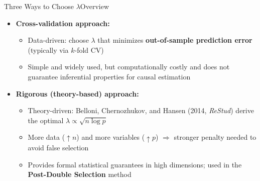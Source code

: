 \documentclass[hyperref={pdfpagelabels=false}]{beamer}
\begin{document}
\begin{frame}{Three Ways to Choose $\lambda$}{Overview}
    \begin{itemize}
        \item[1] \textbf{Cross-validation approach:}
        \vspace{0.2cm}
        \begin{itemize}
            \item Data-driven: choose $\lambda$ that minimizes 
            \textbf{out-of-sample prediction error} (typically via $k$-fold CV)
            \vspace{0.2cm}
            \item Simple and widely used, but computationally costly 
            and does not guarantee inferential properties for causal estimation
        \end{itemize}
        \vspace{0.2cm}
        \item[2] \textbf{Rigorous (theory-based) approach:}
        \vspace{0.2cm}
        \begin{itemize}
            \item Theory-driven: Belloni, Chernozhukov, and Hansen 
            (2014, \textit{ReStud}) derive the optimal 
            $\lambda \propto \sqrt{n \log p}$
            \vspace{0.2cm}
            \item More data ($\uparrow n$) and more variables ($\uparrow p$) 
            $\Rightarrow$ stronger penalty needed to avoid false selection
            \vspace{0.2cm}
            \item Provides formal statistical guarantees in high dimensions; 
            used in the \textbf{Post-Double Selection} method
        \end{itemize}
    \end{itemize}
\end{frame}
\end{document}
